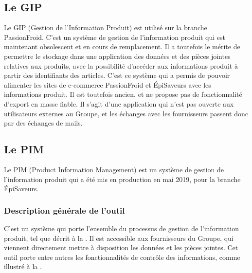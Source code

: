             \subsection{Le GIP}
            \label{GIP}

            Le GIP (Gestion de l'Information Produit) est utilisé sur la branche PassionFroid.
            C'est un système de gestion de l'information produit qui est maintenant obsolescent et en cours de remplacement.
            Il a toutefois le mérite de permettre le stockage dans une application des données et des pièces jointes relatives aux produits, avec la possibilité d'accéder aux informations produit à partir des identifiants des articles.
            C'est ce système qui a permis de pouvoir alimenter les sites de e-commerce PassionFroid et \'{E}piSaveurs avec les informations produit.
            Il est toutefois ancien, et ne propose pas de fonctionnalité d'export en masse fiable.
            Il s'agit d'une application qui n'est pas ouverte aux utilisateurs externes au Groupe, et les échanges avec les fournisseurs passent donc par des échanges de mails.

            \subsection{Le PIM}
            \label{PIM}

            Le PIM (Product Information Management) est un système de gestion de l'information produit qui a été mis en production en mai 2019, pour la branche \'{E}piSaveurs.

                \subsubsection{Description générale de l'outil}

                C'est un système qui porte l'ensemble du processus de gestion de l'information produit, tel que décrit à la .
                Il est accessible aux fournisseurs du Groupe, qui viennent directement mettre à disposition les données et les pièces jointes.
                Cet outil porte entre autres les fonctionnalités de contrôle des informations, comme illustré à la .

